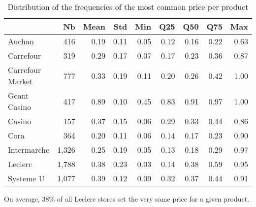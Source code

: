 \documentclass[english]{article}
\begin{document}
\begin{table}[H]
\begin{threeparttable}
\renewcommand{\arraystretch}{0.7}%
\caption{Distribution of the frequencies of the most common price per product}\label{tab:qlmc_prod_freq}
\small
\begin{tabular}{lrrrrrrrr}
\toprule
\toprule
{}                 &  Nb &  Mean &  Std &  Min &  Q25 &  Q50 &  Q75 &  Max \\
\midrule
Auchan             &   416 &  0.19 & 0.11 & 0.05 & 0.12 & 0.16 & 0.22 & 0.63 \\
Carrefour          &   319 &  0.29 & 0.17 & 0.07 & 0.17 & 0.23 & 0.36 & 0.87 \\
Carrefour Market   &   777 &  0.33 & 0.19 & 0.11 & 0.20 & 0.26 & 0.42 & 1.00 \\
Geant Casino       &   417 &  0.89 & 0.10 & 0.45 & 0.83 & 0.91 & 0.97 & 1.00 \\
Casino             &   157 &  0.37 & 0.15 & 0.06 & 0.29 & 0.33 & 0.44 & 0.86 \\
Cora               &   364 &  0.20 & 0.11 & 0.06 & 0.14 & 0.17 & 0.23 & 0.90 \\
Intermarche        & 1,326 &  0.25 & 0.19 & 0.05 & 0.13 & 0.18 & 0.29 & 0.97 \\
Leclerc            & 1,788 &  0.38 & 0.23 & 0.03 & 0.14 & 0.38 & 0.59 & 0.95 \\
Systeme U          & 1,077 &  0.39 & 0.12 & 0.09 & 0.32 & 0.37 & 0.44 & 0.91 \\
\bottomrule
\bottomrule
\end{tabular}
\begin{tablenotes}
      \small
      \item On average, 38\% of all Leclerc stores set the very same price for a given product.
\end{tablenotes}
\end{threeparttable}
\end{table}
\end{document}

